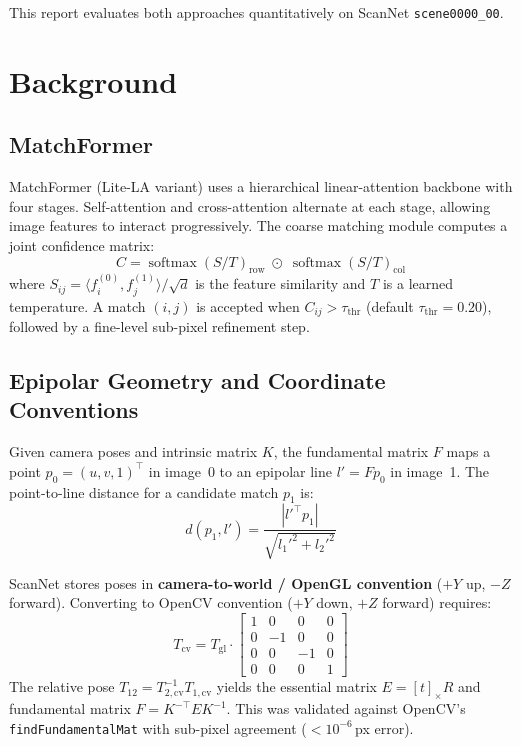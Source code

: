 \documentclass[10pt]{article}
\begin{document}
This report evaluates both approaches quantitatively on ScanNet \texttt{scene0000\_00}.

\section{Background}

\subsection{MatchFormer}

MatchFormer (Lite-LA variant) uses a hierarchical linear-attention backbone with four stages. Self-attention and cross-attention alternate at each stage, allowing image features to interact progressively. The coarse matching module computes a joint confidence matrix:
\begin{equation}
    C = \operatorname{softmax}(S/T)_{\text{row}} \;\odot\; \operatorname{softmax}(S/T)_{\text{col}}
\end{equation}
where $S_{ij} = \langle f_i^{(0)}, f_j^{(1)} \rangle / \sqrt{d}$ is the feature similarity and $T$ is a learned temperature. A match $(i,j)$ is accepted when $C_{ij} > \tau_{\text{thr}}$ (default $\tau_{\text{thr}} = 0.20$), followed by a fine-level sub-pixel refinement step.

\subsection{Epipolar Geometry and Coordinate Conventions}

Given camera poses and intrinsic matrix $K$, the fundamental matrix $F$ maps a point $p_0 = (u, v, 1)^\top$ in image~0 to an epipolar line $l' = F p_0$ in image~1. The point-to-line distance for a candidate match $p_1$ is:
\begin{equation}
    d(p_1, l') = \frac{|{l'}^\top p_1|}{\sqrt{l_1'^2 + l_2'^2}}
\end{equation}

ScanNet stores poses in \textbf{camera-to-world / OpenGL convention} ($+Y$ up, $-Z$ forward). Converting to OpenCV convention ($+Y$ down, $+Z$ forward) requires:
\begin{equation}
    T_{\text{cv}} = T_{\text{gl}} \cdot \begin{bmatrix} 1 & 0 & 0 & 0 \\ 0 & -1 & 0 & 0 \\ 0 & 0 & -1 & 0 \\ 0 & 0 & 0 & 1 \end{bmatrix}
\end{equation}
The relative pose $T_{12} = T_{2,\text{cv}}^{-1} T_{1,\text{cv}}$ yields the essential matrix $E = [t]_\times R$ and fundamental matrix $F = K^{-\top} E K^{-1}$. This was validated against OpenCV's \texttt{findFundamentalMat} with sub-pixel agreement ($<10^{-6}$\,px error).
\end{document}
